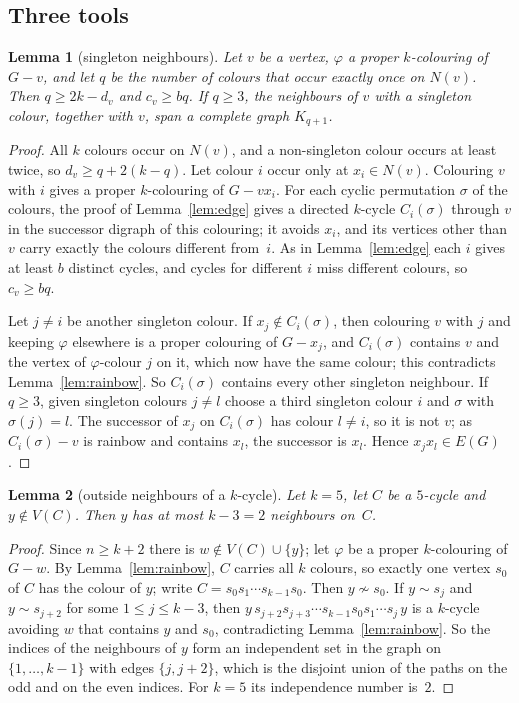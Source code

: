 \documentclass[11pt]{article}
\newtheorem{lemma}{Lemma}
\theoremstyle{remark}
\begin{document}
\subsection{Three tools}

\begin{lemma}[singleton neighbours]\label{lem:singleton}
Let $v$ be a vertex, $\varphi$ a proper $k$-colouring of $G-v$, and let $q$ be
the number of colours that occur exactly once on $N(v)$. Then
$q\ge 2k-d_v$ and $c_v\ge bq$. If $q\ge3$, the neighbours of $v$ with a
singleton colour, together with $v$, span a complete graph $K_{q+1}$.
\end{lemma}

\begin{proof}
All $k$ colours occur on $N(v)$, and a non-singleton colour occurs at least
twice, so $d_v\ge q+2(k-q)$. Let colour $i$ occur only at $x_i\in N(v)$.
Colouring $v$ with $i$ gives a proper $k$-colouring of $G-vx_i$. For each cyclic
permutation $\sigma$ of the colours, the proof of Lemma~\ref{lem:edge} gives a
directed $k$-cycle $C_i(\sigma)$ through $v$ in the successor digraph of this
colouring; it avoids $x_i$, and its vertices other than $v$ carry exactly the
colours different from~$i$. As in Lemma~\ref{lem:edge} each $i$ gives at least
$b$ distinct cycles, and cycles for different $i$ miss different colours, so
$c_v\ge bq$.

Let $j\ne i$ be another singleton colour. If $x_j\notin C_i(\sigma)$, then
colouring $v$ with $j$ and keeping $\varphi$ elsewhere is a proper colouring of
$G-x_j$, and $C_i(\sigma)$ contains $v$ and the vertex of $\varphi$-colour $j$
on it, which now have the same colour; this contradicts
Lemma~\ref{lem:rainbow}. So $C_i(\sigma)$ contains every other singleton
neighbour. If $q\ge3$, given singleton colours $j\ne l$ choose a third singleton
colour $i$ and $\sigma$ with $\sigma(j)=l$. The successor of $x_j$ on
$C_i(\sigma)$ has colour $l\ne i$, so it is not $v$; as $C_i(\sigma)-v$ is
rainbow and contains $x_l$, the successor is $x_l$. Hence $x_jx_l\in E(G)$.
\end{proof}

\begin{lemma}[outside neighbours of a $k$-cycle]\label{lem:attach}
Let $k=5$, let $C$ be a $5$-cycle and $y\notin V(C)$. Then $y$ has at most
$k-3=2$ neighbours on~$C$.
\end{lemma}

\begin{proof}
Since $n\ge k+2$ there is $w\notin V(C)\cup\{y\}$; let $\varphi$ be a proper
$k$-colouring of $G-w$. By Lemma~\ref{lem:rainbow}, $C$ carries all $k$ colours,
so exactly one vertex $s_0$ of $C$ has the colour of $y$; write
$C=s_0s_1\cdots s_{k-1}s_0$. Then $y\not\sim s_0$. If $y\sim s_j$ and
$y\sim s_{j+2}$ for some $1\le j\le k-3$, then
$y\,s_{j+2}s_{j+3}\cdots s_{k-1}s_0s_1\cdots s_j\,y$ is a $k$-cycle avoiding
$w$ that contains $y$ and $s_0$, contradicting Lemma~\ref{lem:rainbow}. So the
indices of the neighbours of $y$ form an independent set in the graph on
$\{1,\dots,k-1\}$ with edges $\{j,j+2\}$, which is the disjoint union of the
paths on the odd and on the even indices. For $k=5$ its independence number
is~$2$.
\end{proof}
\end{document}
